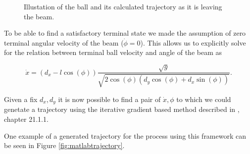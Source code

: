 \begin{figure}[\textwidth]
\centering

\caption{Illustation of the ball and its calculated trajectory as it is leaving the beam.}
\label{fig:throw}
\end{figure}
%
%


To be able to find a satisfactory terminal state we made the assumption of zero terminal angular velocity of the beam ($\dot{\phi}=0$). This allows us to explicitly solve for the relation between terminal ball velocity and angle of the beam as

%
%
%
%
%
\[
\dot{x}=\left(d_{x}-l\cos(\phi)\right)\frac{\sqrt{g}}{\sqrt{2\cos(\phi)\left(d_{y}\cos(\phi)+d_{x}\sin(\phi)\right)}}.
\]

Given a fix $d_x,d_y$ it is now possible to find a pair of $\dot x,\phi$ to which we could genetate a trajectory using the iterative gradient based method described in \cite{NR}, chapter 21.1.1.

One example of a generated trajectory for the process using this framework can be seen in Figure \ref{fig:matlabtrajectory}.

